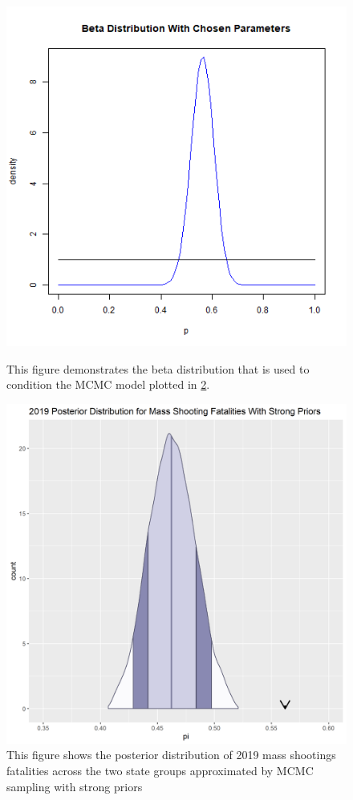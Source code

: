 \documentclass{article}
\begin{document}
\begin{figure}[!h]
    \centering
    \includegraphics[scale=.6]{Figure2.png}\label{Figure 2}
    \caption{This figure demonstrates the beta distribution that is used to condition the MCMC model plotted in \ref{fig:3}.}
    \label{fig:2}
\end{figure}

\begin{figure}[!h]
    \centering
    \includegraphics[scale=.5]{Figure3.png}
    \caption{This figure shows the posterior distribution of 2019 mass shootings fatalities across the two state groups approximated by MCMC sampling with strong priors}
    \label{fig:3}
\end{figure}
\end{document}
